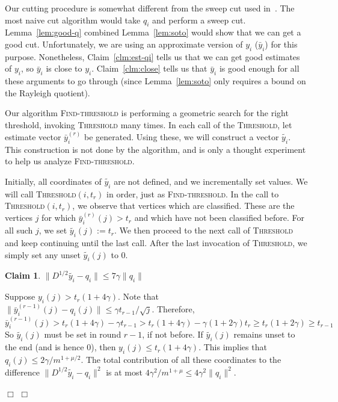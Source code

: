 \documentclass[11pt]{article}
\newtheorem{claim}[theorem]{Claim}
\newenvironment{myproof}{\noindent {\sc Proof:}}{$\Box$}
\newcommand\qi{q_i}
\newcommand\qbi{\bar{y}_i}
\newcommand\qti{\widetilde{y_i}}
\newcommand\halfqi{y_i}
\newcommand\Threshold{\textsc{Threshold}\xspace}
\newcommand\Find{\textsc{Find-threshold}\xspace}
\def\Dhalf{D^{1/2}}
\begin{document}
\begin{myproof} Our cutting procedure is somewhat different from the
sweep cut used in~\cite{Tre09}. The most naive cut algorithm would
take $q_i$ and perform a sweep cut. Lemma~\ref{lem:good-q} combined
Lemma~\ref{lem:soto} would show that we can get a good cut. Unfortunately,
we are using an approximate version of $\halfqi$ ($\qbi$) for this purpose.
Nonetheless, Claim~\ref{clm:est-qi} tells us that we can get
good estimates of $\halfqi$, so $\qbi$ is close to $\halfqi$. Claim~\ref{clm:close}
tells us that $\qbi$ is good enough for all these arguments to go through
(since Lemma~\ref{lem:soto} only requires a bound on the Rayleigh quotient).

Our algorithm {\Find} is performing a geometric search for the right
threshold, invoking {\Threshold} many times. In each call
of the {\Threshold}, let estimate vector $\qbi^{(r)}$
be generated. Using these, we will construct a vector $\qti$.
This construction is not done by the algorithm, and is only
a thought experiment to help us analyze {\Find}.

Initially, all coordinates of $\qti$ are not defined, and we
incrementally set values. We will call {\Threshold}$(i,t_r)$
in order, just as {\Find}. In the call to {\Threshold}$(i,t_r)$,
we observe that vertices which are classified. These are
the vertices $j$ for which $\qbi^{(r)}(j) > t_r$ and
which have not been classified before. For all such $j$,
we set $\qti(j) := t_r$. We then proceed to the next
call of {\Threshold} and keep continuing until
the last call. After the last invocation of {\Threshold},
we simply set any unset $\qti(j)$ to $0$.

\begin{claim} \label{clm:qti} $\|\Dhalf \qti - \qi\| \leq 7\gamma \|\qi\|$
\end{claim}

\begin{myproof} Suppose $\halfqi(j) > t_r (1+4\gamma)$. Note that $\|\qbi^{(r-1)}(j) - \qi(j)\| \leq \gamma t_{r-1}/\sqrt{j}$.
Therefore,
$$\qbi^{(r-1)}(j) > t_r (1+4\gamma) - \gamma t_{r-1} > t_r(1+4\gamma) - \gamma (1+2\gamma) t_r
\geq t_r (1+2\gamma) \geq t_{r-1}$$
So $\qti(j)$ must be set in round $r-1$, if not before. If $\qti(j)$ remains
unset to the end (and is hence $0$), then $\halfqi(j) \leq t_r (1+4\gamma) $.
This implies that $\qi(j) \leq 2\gamma/m^{1+\mu/2}$. The total contribution
of all these coordinates to the difference $\|\Dhalf \qti - \qi\|^2$ is
at most $4\gamma^2/m^{1+\mu} \leq 4\gamma^2 \|\qi\|^2$.


\end{myproof}
\end{myproof}
\end{document}
